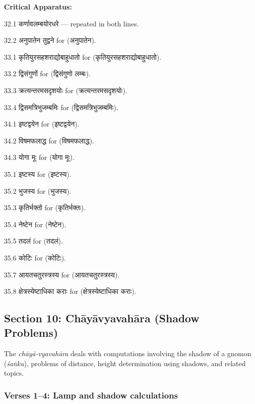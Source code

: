 \documentclass[11pt,a4paper]{article}
\newcommand{\dev}[1]{{\devanagarifont #1}}
\newenvironment{variants}{%
  \small%
  \color{varecolor}%
  \list{}{\leftmargin=2em\itemindent=-1em}%
}{\endlist}
\begin{document}
\vspace{0.4cm}
\textcolor{varecolor}{\textbf{Critical Apparatus:}}
\begin{variants}
\item[32.1] \dev{कर्णावलम्बयोरधरे} --- repeated in both lines.
\item[32.2] \dev{अनुपातेन तुद्वने} \dev{for} (\dev{अनुपातेन}).
\item[33.1] \dev{कृतियुरसहशराद्योबाहुधातो} \dev{for} (\dev{कृतियुरसहशराद्योबाहुधातो}).
\item[33.2] \dev{द्विसंगुणों} \dev{for} (\dev{द्विसंगुणो लम्बः}).
\item[33.3] \dev{क्रत्यन्तरमसदृशयोः} \dev{for} (\dev{क्रत्यन्तरमसदृशयोः}).
\item[33.4] \dev{द्विसमत्रिभुजम्बमिः} \dev{for} (\dev{द्विसमत्रिभुजम्बमिः}).
\item[34.1] \dev{इष्टद्वयेन} \dev{for} (\dev{इष्टद्वयेन}).
\item[34.2] \dev{विषमफलाद्ध} \dev{for} (\dev{विषमफलाद्ध}).
\item[34.3] \dev{योगा मूः} \dev{for} (\dev{योगा मूः}).
\item[35.1] \dev{इष्टस्य} \dev{for} (\dev{इष्टस्य}).
\item[35.2] \dev{भुजस्य} \dev{for} (\dev{भुजस्य}).
\item[35.3] \dev{कृतिर्भक्तो} \dev{for} (\dev{कृतिर्भक्तः}).
\item[35.4] \dev{नेष्टेन} \dev{for} (\dev{नेष्टेन}).
\item[35.5] \dev{तदलं} \dev{for} (\dev{तदलं}).
\item[35.6] \dev{कोटिः} \dev{for} (\dev{कोटिः}).
\item[35.7] \dev{आयतचतुरस्त्रस्य} \dev{for} (\dev{आयतचतुरस्त्रस्य}).
\item[35.8] \dev{क्षेत्रस्येष्टाधिका कराः} \dev{for} (\dev{क्षेत्रस्येष्टाधिका कराः}).
\end{variants}

\newpage

\subsection*{Section 10: Chāyāvyavahāra (Shadow Problems)}

The \textit{chāyā-vyavahāra} deals with computations involving the shadow of a gnomon
(\textit{śaṅku}), problems of distance, height determination using shadows, and
related topics.

\subsubsection*{Verses 1--4: Lamp and shadow calculations}
\end{document}
